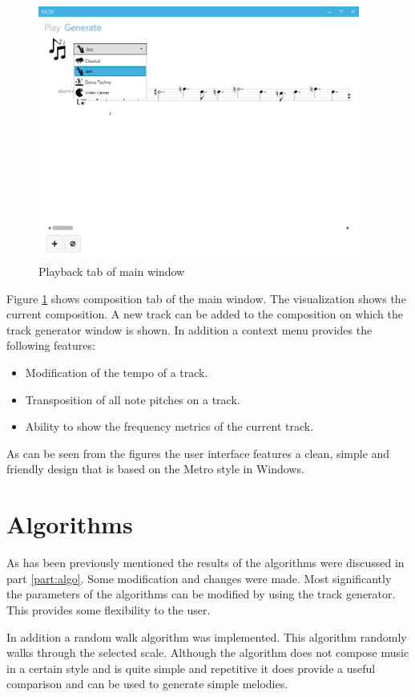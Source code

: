 \begin{figure}
\centerline{\includegraphics[width=400px]{../images/res_ui_generate_tab.png}}
\caption{Playback tab of main window}
\label{ims:res_ui_generate}
\end{figure}

Figure \ref{ims:res_ui_generate} shows composition tab of the main window. The visualization shows the current composition. A new track can be added to the composition on which the track generator window is shown. 
In addition a context menu provides the following features:
\begin{itemize}
\item Modification of the tempo of a track.
\item Transposition of all note pitches on a track.
\item Ability to show the frequency metrics of the current track.
\end{itemize}

As can be seen from the figures the user interface features a clean, simple and friendly design that is based on the Metro style in Windows.


\section{Algorithms}
As has been previously mentioned the results of the algorithms were discussed in part \ref{part:algo}.
Some modification and changes were made. Most significantly the parameters of the algorithms can be modified by using the track generator. This provides some flexibility to the user.

In addition a random walk algorithm was implemented. This algorithm randomly walks through the selected scale. Although the algorithm does not compose music in a certain style and is quite simple and repetitive it does provide a useful comparison and can be used to generate simple melodies.

